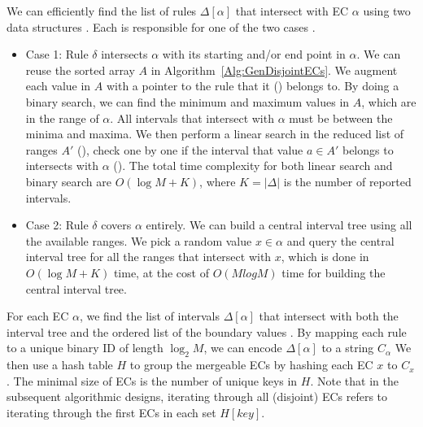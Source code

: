 We can efficiently find the list of rules $\Delta[\alpha]$ that intersect with EC $\alpha$ using two data structures . Each is responsible for one of the two cases \cite{FindIntersectionWiki}.
\begin{itemize}
\item Case 1: Rule $\delta$ intersects $\alpha$ with its starting and/or end point in $\alpha$.
        We can reuse the sorted array $A$ in Algorithm~\ref{Alg:GenDisjointECs}.
        We augment each value in $A$ with a pointer to the rule that it () belongs to.
        By doing a binary search, we can find the minimum and maximum values in $A$, which are in the range of $\alpha$.
        All intervals that intersect with $\alpha$ must be between the minima and maxima.
        We then perform a linear search in the reduced list of ranges $A'$ (),
        check one by one if the interval that value $a\in A'$ belongs to intersects with $\alpha$ ().
        The total time complexity for both linear search and binary search are $O(\log M + K)$,
        where $K=|\Delta|$ is the number of reported intervals.
        
\item Case 2: Rule $\delta$ covers $\alpha$ entirely. We can build
        a central interval tree\cite{ComputationalGeometryBook} using all the available ranges.
        We pick a random value $x \in \alpha$ and query the central interval tree for
        all the ranges that intersect with $x$, which is done in $O(\log M + K)$ time,
        at the cost of $O(M log M)$ time for building the central interval tree. 
\end{itemize}

For each EC $\alpha$, we find the list of intervals $\Delta[\alpha]$
that intersect with both the interval tree and the ordered list of the boundary values .
By mapping each rule to a unique binary ID of length $\log_2 M$,
we can encode $\Delta[\alpha]$ to a string $C_\alpha$ 
We then use a hash table $H$ to group the mergeable ECs by hashing each EC $x$ to $C_x$.
The minimal size of ECs is the number of unique keys in $H$. Note that in the subsequent algorithmic designs, iterating through all (disjoint) ECs refers to iterating through the first ECs in each set $H[key]$.%

